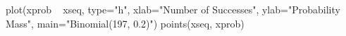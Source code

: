 \begin{Schunk}
\begin{Sinput}
  plot(xprob ~ xseq, type="h", xlab="Number of Successes", ylab="Probability Mass",  main="Binomial(197, 0.2)")
  points(xseq, xprob)
\end{Sinput}
\end{Schunk}
